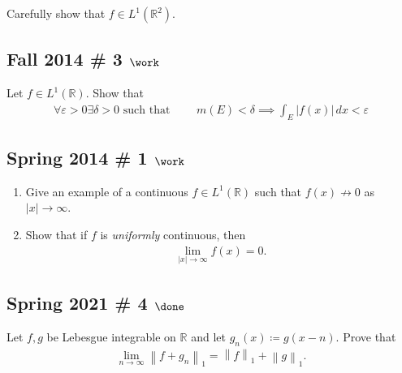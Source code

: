 Carefully show that \(f \in L^1({\mathbb{R}}^2)\).

\hypertarget{fall-2014-3-work}{%
\subsection{\texorpdfstring{Fall 2014 \# 3
\(\work\)}{Fall 2014 \# 3 \textbackslash work}}\label{fall-2014-3-work}}

Let \(f\in L^1({\mathbb{R}})\). Show that
\begin{align*}
\forall\varepsilon > 0 \exists \delta > 0 \text{ such that } \qquad 
m(E) < \delta 
\implies 
\int _{E} |f(x)| \, dx < \varepsilon
\end{align*}

\hypertarget{spring-2014-1-work}{%
\subsection{\texorpdfstring{Spring 2014 \# 1
\(\work\)}{Spring 2014 \# 1 \textbackslash work}}\label{spring-2014-1-work}}

\begin{enumerate}
\def\labelenumi{\arabic{enumi}.}
\item
  Give an example of a continuous \(f\in L^1({\mathbb{R}})\) such that
  \(f(x) \not\to 0\) as\({\left\lvert {x} \right\rvert} \to \infty\).
\item
  Show that if \(f\) is \emph{uniformly} continuous, then
  \begin{align*}
  \lim_{{\left\lvert {x} \right\rvert} \to \infty} f(x) = 0.
  \end{align*}
\end{enumerate}

\hypertarget{spring-2021-4-done}{%
\subsection{\texorpdfstring{Spring 2021 \# 4
\(\done\)}{Spring 2021 \# 4 \textbackslash done}}\label{spring-2021-4-done}}

Let \(f, g\) be Lebesgue integrable on \({\mathbb{R}}\) and let
\(g_n(x) \coloneqq g(x- n)\). Prove that
\begin{align*}
\lim_{n\to \infty } {\left\lVert {f + g_n} \right\rVert}_1 = {\left\lVert {f} \right\rVert}_1 + {\left\lVert {g} \right\rVert}_1
.\end{align*}

